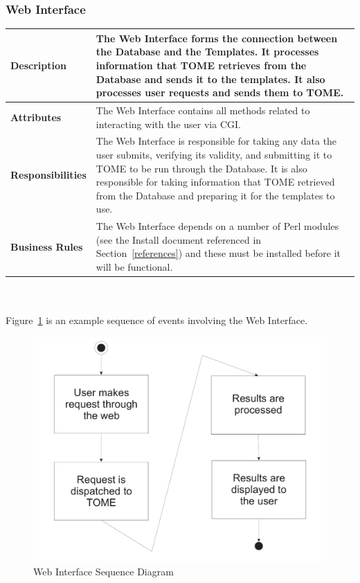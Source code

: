 \documentclass[12pt,titlepage]{article}
\begin{document}
\subsubsection{Web Interface}
\begin{tabular}{|p{}|p{}|}
	\hline
	\textbf{Description} & The Web Interface forms the connection between the Database and the Templates.  It processes information that TOME retrieves from the Database and sends it to the templates.  It also processes user requests and sends them to TOME.\\
	\hline
	\textbf{Attributes} & The Web Interface contains all methods related to interacting with the user via CGI.\\
	\hline
	\textbf{Responsibilities} & The Web Interface is responsible for taking any data the user submits, verifying its validity, and submitting it to TOME to be run through the Database.  It is also responsible for taking information that TOME retrieved from the Database and preparing it for the templates to use.\\
	\hline
	\textbf{Business Rules} & The Web Interface depends on a number of Perl modules (see the Install document referenced in Section~\ref{references}) and these must be installed before it will be functional.\\
	\hline
\end{tabular}
\\
\\
Figure~\ref{WebInterfaceSequenceDiagram} is an example sequence of events involving the Web Interface.
\begin{figure}[h]
	\centering
	\includegraphics[width=.5\textwidth]{WebInterfaceSequenceDiagram}
	\caption{Web Interface Sequence Diagram}
	\label{WebInterfaceSequenceDiagram}
\end{figure}
\end{document}
